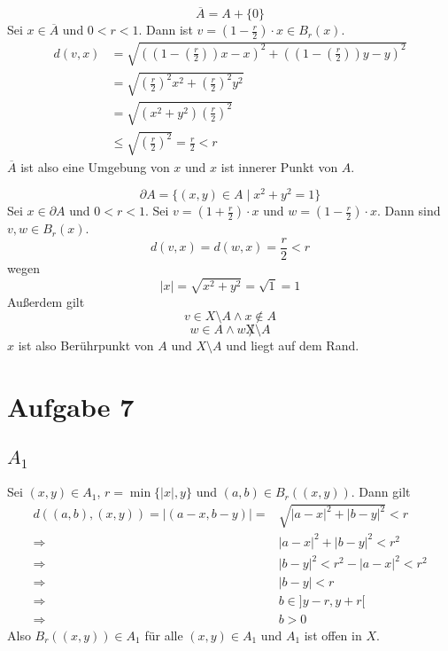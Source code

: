 \documentclass[10pt,a4paper]{article}
\begin{document}
\begin{equation}
\overline{A} = A + \{0\}
\end{equation}
Sei $x \in \overline{A}$ und $0 < r < 1$.
Dann ist $v = (1 - \frac{r}{2}) \cdot x \in B_{r}(x)$.
\begin{align}
d(v, x) & = \sqrt{((1 - (\frac{r}{2}))x - x)^{2} + ((1 - (\frac{r}{2}))y - y)^{2}}\\
& = \sqrt{(\frac{r}{2})^{2}x^2 + (\frac{r}{2})^2 y^2}\\
& = \sqrt{(x^2 + y^2)(\frac{r}{2})^2}\\
& \le \sqrt{(\frac{r}{2})^2} = \frac{r}{2} < r
\end{align}
$\overline{A}$ ist also eine Umgebung von $x$ und $x$ ist innerer Punkt von $A$.

\begin{equation}
\partial A = \{(x, y) \in A \mid x^{2} + y^{2} = 1\}
\end{equation}
Sei $x \in \partial A$ und $0 < r < 1$.
Sei $v = (1 + \frac{r}{2}) \cdot x$ und $w = (1 - \frac{r}{2}) \cdot x$.
Dann sind $v, w \in B_{r}(x)$.
\begin{equation}
d(v, x) = d(w, x) = \frac{r}{2} < r
\end{equation}
wegen
\begin{equation}
|x| = \sqrt{x^{2} + y^{2}} = \sqrt{1} = 1
\end{equation}
Außerdem gilt
\begin{equation}
v \in X \setminus A \land x \notin A
\end{equation}
\begin{equation}
w \in A \land w \not X \setminus A
\end{equation}
$x$ ist also Berührpunkt von $A$ und $X \setminus A$ und liegt auf dem Rand.

\section*{Aufgabe 7}

\subsection*{$A_{1}$}

Sei $(x, y) \in A_{1}$, $r = \min \{|x|, y\}$ und $(a, b) \in B_{r}((x, y))$.
Dann gilt
\begin{align*}
d((a, b), (x, y)) = |(a - x, b - y)| = & \sqrt{|a - x|^{2} + |b - y|^{2}} < r\\
\Rightarrow & |a - x|^{2} + |b - y|^{2} < r^{2}\\
\Rightarrow & |b - y|^{2} < r^{2} - |a - x|^{2} < r^{2}\\
\Rightarrow & |b - y| < r\\
\Rightarrow & b \in ]y - r, y + r[\\
\Rightarrow & b > 0
\end{align*}
Also $B_{r}((x, y)) \in A_{1}$ für alle $(x, y) \in A_{1}$ und $A_{1}$ ist offen in $X$.
\end{document}

